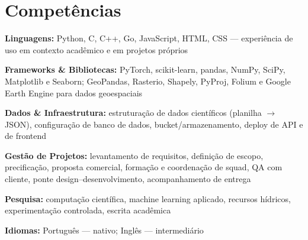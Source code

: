 \documentclass[11pt,a4paper]{article}
\begin{document}
\section*{Competências}

\textbf{Linguagens:} Python, C, C++, Go, JavaScript, HTML, CSS --- experiência
de uso em contexto acadêmico e em projetos próprios

\vspace{3pt}
\textbf{Frameworks \& Bibliotecas:} PyTorch, scikit-learn, pandas, NumPy, SciPy,
Matplotlib e Seaborn; GeoPandas, Rasterio, Shapely, PyProj, Folium e Google Earth
Engine para dados geoespaciais

\vspace{3pt}
\textbf{Dados \& Infraestrutura:} estruturação de dados científicos
(planilha $\rightarrow$ JSON), configuração de banco de dados,
bucket/armazenamento, deploy de API e de frontend

\vspace{3pt}
\textbf{Gestão de Projetos:} levantamento de requisitos, definição de escopo,
precificação, proposta comercial, formação e coordenação de squad, QA com
cliente, ponte design--desenvolvimento, acompanhamento de entrega

\vspace{3pt}
\textbf{Pesquisa:} computação científica, machine learning aplicado, recursos
hídricos, experimentação controlada, escrita acadêmica

\vspace{3pt}
\textbf{Idiomas:} Português --- nativo; Inglês --- intermediário
\end{document}

